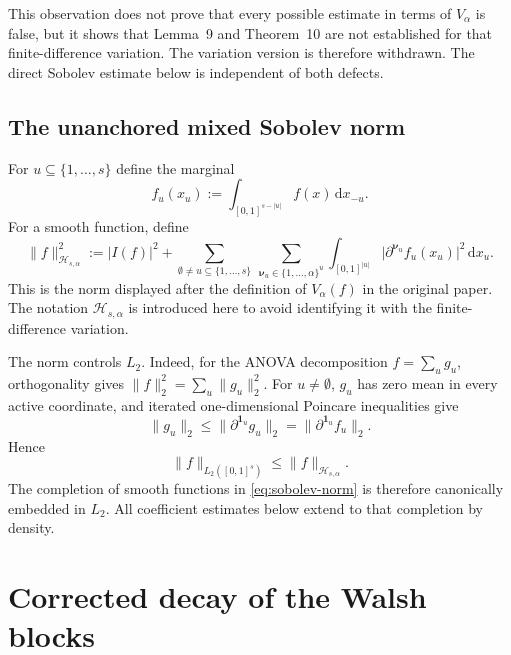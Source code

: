 \documentclass[11pt]{article}
\newcommand{\abs}[1]{\lvert #1\rvert}
\newcommand{\norm}[1]{\lVert #1\rVert}
\newcommand{\dd}{\,\mathrm d}
\begin{document}
This observation does not prove that every possible estimate in terms of
$V_\alpha$ is false, but it shows that Lemma~9 and Theorem~10 are not established
for that finite-difference variation.  The variation version is therefore
withdrawn.  The direct Sobolev estimate below is independent of both defects.

\subsection{The unanchored mixed Sobolev norm}

For $u\subseteq\{1,\ldots,s\}$ define the marginal
\[
 f_u(x_u):=\int_{[0,1]^{s-\abs u}}f(x)\dd x_{-u}.
\]
For a smooth function, define
\begin{equation}\label{eq:sobolev-norm}
 \norm{f}_{\mathcal H_{s,\alpha}}^2
 :=\abs{I(f)}^2
 +\sum_{\emptyset\ne u\subseteq\{1,\ldots,s\}}
   \ \sum_{\boldsymbol\nu_u\in\{1,\ldots,\alpha\}^{u}}
   \int_{[0,1]^{\abs u}}
   \abs{\partial^{\boldsymbol\nu_u}f_u(x_u)}^2\dd x_u.
\end{equation}
This is the norm displayed after the definition of $V_\alpha(f)$ in the
original paper.  The notation $\mathcal H_{s,\alpha}$ is introduced here to
avoid identifying it with the finite-difference variation.

The norm controls $L_2$.  Indeed, for the ANOVA decomposition
$f=\sum_ug_u$, orthogonality gives
$\norm f_2^2=\sum_u\norm{g_u}_2^2$.  For $u\ne\emptyset$, $g_u$ has zero
mean in every active coordinate, and iterated one-dimensional Poincare
inequalities give
\[
 \norm{g_u}_2\le\norm{\partial^{\boldsymbol1_u}g_u}_2
 =\norm{\partial^{\boldsymbol1_u}f_u}_2.
\]
Hence
\begin{equation}\label{eq:H-embeds-L2}
 \norm f_{L_2([0,1]^s)}\le\norm f_{\mathcal H_{s,\alpha}}.
\end{equation}
The completion of smooth functions in \eqref{eq:sobolev-norm} is therefore
canonically embedded in $L_2$.  All coefficient estimates below extend to that
completion by density.

\section{Corrected decay of the Walsh blocks}
\end{document}
